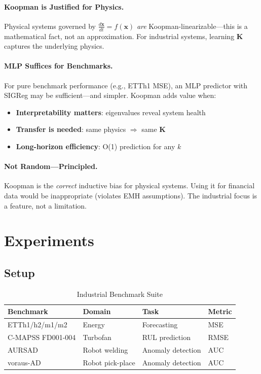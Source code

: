 \documentclass{article}
\begin{document}
\paragraph{Koopman is Justified for Physics.} Physical systems governed by $\frac{d\mathbf{x}}{dt} = f(\mathbf{x})$ \emph{are} Koopman-linearizable—this is a mathematical fact, not an approximation. For industrial systems, learning $\mathbf{K}$ captures the underlying physics.

\paragraph{MLP Suffices for Benchmarks.} For pure benchmark performance (e.g., ETTh1 MSE), an MLP predictor with SIGReg may be sufficient—and simpler. Koopman adds value when:
\begin{itemize}
    \item \textbf{Interpretability matters}: eigenvalues reveal system health
    \item \textbf{Transfer is needed}: same physics $\Rightarrow$ same $\mathbf{K}$
    \item \textbf{Long-horizon efficiency}: O(1) prediction for any $k$
\end{itemize}

\paragraph{Not Random—Principled.} Koopman is the \emph{correct} inductive bias for physical systems. Using it for financial data would be inappropriate (violates EMH assumptions). The industrial focus is a feature, not a limitation.

\section{Experiments}

\subsection{Setup}

\begin{table}[h]
\centering
\caption{Industrial Benchmark Suite}
\small
\begin{tabular}{@{}llll@{}}
\toprule
\textbf{Benchmark} & \textbf{Domain} & \textbf{Task} & \textbf{Metric} \\
\midrule
ETTh1/h2/m1/m2 & Energy & Forecasting & MSE \\
C-MAPSS FD001-004 & Turbofan & RUL prediction & RMSE \\
AURSAD & Robot welding & Anomaly detection & AUC \\
voraus-AD & Robot pick-place & Anomaly detection & AUC \\
\bottomrule
\end{tabular}
\end{table}
\end{document}
